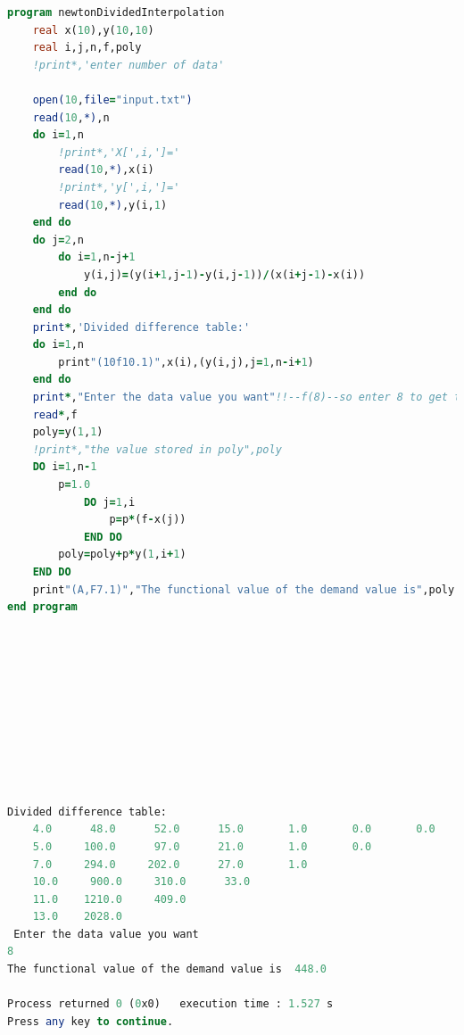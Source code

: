 \documentclass{article}
\begin{document}
\begin{lstlisting}[language=Fortran,caption=Newton Divided Interpolation]
program newtonDividedInterpolation
    real x(10),y(10,10)
    real i,j,n,f,poly
    !print*,'enter number of data'

    open(10,file="input.txt")
    read(10,*),n
    do i=1,n
        !print*,'X[',i,']='
        read(10,*),x(i)
        !print*,'y[',i,']='
        read(10,*),y(i,1)
    end do
    do j=2,n
        do i=1,n-j+1
            y(i,j)=(y(i+1,j-1)-y(i,j-1))/(x(i+j-1)-x(i))
        end do
    end do
    print*,'Divided difference table:'
    do i=1,n
        print"(10f10.1)",x(i),(y(i,j),j=1,n-i+1)
    end do
    print*,"Enter the data value you want"!!--f(8)--so enter 8 to get the answer 448--!
    read*,f
    poly=y(1,1)
    !print*,"the value stored in poly",poly
    DO i=1,n-1
        p=1.0
            DO j=1,i
                p=p*(f-x(j))
            END DO
        poly=poly+p*y(1,i+1)
    END DO
    print"(A,F7.1)","The functional value of the demand value is",poly
end program












\end{lstlisting}
\begin{lstlisting}[language=Fortran,caption=Newton Divided Interpolation Output]
 Divided difference table:
    4.0      48.0      52.0      15.0       1.0       0.0       0.0
    5.0     100.0      97.0      21.0       1.0       0.0
    7.0     294.0     202.0      27.0       1.0
    10.0     900.0     310.0      33.0
    11.0    1210.0     409.0
    13.0    2028.0
 Enter the data value you want
8
The functional value of the demand value is  448.0

Process returned 0 (0x0)   execution time : 1.527 s
Press any key to continue.
\end{lstlisting}
\end{document}
